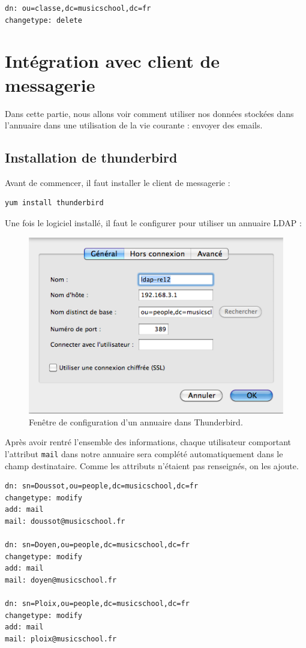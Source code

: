 \documentclass[12pt,a4paper,notitlepage]{article}
\begin{document}
\begin{lstlisting}[title=delete-classe.ldif]
dn: ou=classe,dc=musicschool,dc=fr
changetype: delete
\end{lstlisting}


\clearpage
\section{Intégration avec client de messagerie}

Dans cette partie, nous allons voir comment utiliser nos données stockées dans l'annuaire dans une utilisation de la vie courante : envoyer des emails.
\subsection{Installation de thunderbird}

Avant de commencer, il faut installer le client de messagerie :
\begin{verbatim}
yum install thunderbird
\end{verbatim}

\bigskip

Une fois le logiciel installé, il faut le configurer pour utiliser un annuaire LDAP :

\begin{figure}[!h]
\begin{center}
\includegraphics[scale=0.61]{thunderbird-ldap}
\caption{Fenêtre de configuration d'un annuaire dans Thunderbird.}
\label{fig:da}
\end{center}
\end{figure}

Après avoir rentré l'ensemble des informations, chaque utilisateur comportant l'attribut \texttt{mail} dans notre annuaire sera complété automatiquement dans le champ destinataire. Comme les attributs n'étaient pas renseignés, on les ajoute.\\

\begin{lstlisting}[title=ajout-mail.ldif]
dn: sn=Doussot,ou=people,dc=musicschool,dc=fr
changetype: modify
add: mail
mail: doussot@musicschool.fr

dn: sn=Doyen,ou=people,dc=musicschool,dc=fr
changetype: modify
add: mail
mail: doyen@musicschool.fr

dn: sn=Ploix,ou=people,dc=musicschool,dc=fr
changetype: modify
add: mail
mail: ploix@musicschool.fr
\end{lstlisting}
\end{document}
